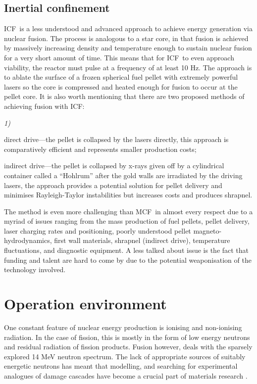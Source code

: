 \documentclass[12pt, a4paper]{article}
\newcommand{\mc}{MCF}
\newcommand{\ic}{ICF}
\begin{document}
		\subsection{Inertial confinement}\label{s:ic}
		\ic~is a less understood and advanced approach to achieve energy generation via nuclear fusion. The process is analogous to a star core, in that fusion is achieved by massively increasing density and temperature enough to sustain nuclear fusion for a very short amount of time. This means that for \ic~to even approach viability, the reactor must pulse at a frequency of at least 10 Hz. The approach is to ablate the surface of a frozen spherical fuel pellet with extremely powerful lasers so the core is compressed and heated enough for fusion to occur at the pellet core. It is also worth mentioning that there are two proposed methods of achieving fusion with \ic:
		\begin{inparaenum}{\itshape1\upshape)}
			\item direct drive---the pellet is collapsed by the lasers directly, this approach is comparatively efficient and represents smaller production costs;
			\item indirect drive---the pellet is collapsed by x-rays given off by a cylindrical container called a ``Hohlrum'' after the gold walls are irradiated by the driving lasers, the approach provides a potential solution for pellet delivery and minimises Rayleigh-Taylor instabilities but increases costs and produces shrapnel.
		\end{inparaenum}
		
		The method is even more challenging than \mc~in almost every respect due to a myriad of issues ranging from the mass production of fuel pellets, pellet delivery, laser charging rates and positioning, poorly understood pellet magneto-hydrodynamics, first wall materials, shrapnel (indirect drive), temperature fluctuations, and diagnostic equipment. A less talked about issue is the fact that funding and talent are hard to come by due to the potential weaponisation of the technology involved.
	\section{Operation environment}\label{s:op}
	
		One constant feature of nuclear energy production is ionising and non-ionising radiation. In the case of fission, this is mostly in the form of low energy neutrons and residual radiation of fission products. Fusion however, deals with the sparsely explored 14 MeV neutron spectrum. The lack of appropriate sources of suitably energetic neutrons has meant that modelling, and searching for experimental analogues of damage cascades have become a crucial part of materials research \cite{model, dpa}.
		
\end{document}
